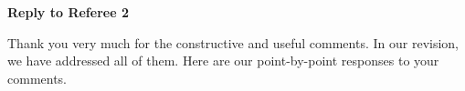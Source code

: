 \documentclass[a4paper,12pt]{article}
\begin{document}
\begin{enumerate}[label=(\arabic*),leftmargin=0.7cm]


\end{enumerate}



\vspace{10pt}

\begin{center}
{\large \bf Reply to Referee 2} 
\end{center}


Thank you very much for the constructive and useful comments. In our revision, we have addressed all of them. Here are our point-by-point responses to your comments. 
\end{document}
